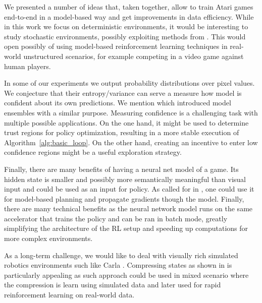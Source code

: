 We presented a number of ideas that, taken together, allow to train Atari games end-to-end in a model-based way and get improvements in data efficiency.
While in this work we focus on deterministic environments, it would be interesting to study stochastic environments, possibly exploiting methods from \cite{world_models}. This would open possibly of using model-based reinforcement learning techniques in real-world unstructured scenarios, for example competing in a video game against human players. 

In some of our experiments we output probability distributions over pixel values. We conjecture that their entropy/variance can serve a measure how model is confident about its own predictions. We mention \cite{trpo_ensemble} which introduced model ensembles with a similar purpose. Measuring confidence is a challenging task with multiple possible applications. On the one hand, it might be used to determine trust regions for policy optimization, resulting in a more stable execution of Algorithm~\ref{alg:basic_loop}. On the other hand, creating an incentive to enter low confidence regions might be a useful exploration strategy. 

Finally, there are many benefits of having a neural net model of a game. Its hidden state is smaller and possibly more semantically meaningful than visual input and could be used as an input for policy. As called for in \cite{modelplanning}, one could use it for model-based planning and propagate gradients though the model. Finally, there are many technical benefits as the neural network model runs on the same accelerator that trains the policy and can be ran in batch mode, greatly simplifying the architecture of the RL setup and speeding up computations for more complex environments.

As a long-term challenge, we would like to deal with visually rich simulated robotics environments such like Carla \cite{carla}. Compressing states as shown in \cite{world_models} is particularly appealing as such approach could be used in mixed scenario where the compression is learn using simulated data and later used for rapid reinforcement learning on real-world data. 